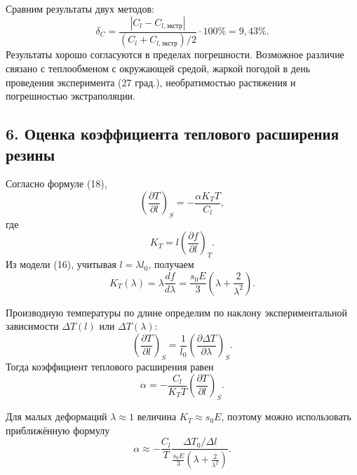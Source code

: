 \documentclass[12pt,a4paper]{article}
\numberwithin{equation}{section}
\begin{document}
Сравним результаты двух методов:
\[
    \delta_C
    =
    \frac{
        \left|C_l-C_{l,\text{экстр}}\right|
    }{
        \left(C_l+C_{l,\text{экстр}}\right)/2
    }\cdot100\%
    =
    9{,}43\%.
\]
Результаты хорошо согласуются в пределах погрешности.
Возможное различие связано с теплообменом с окружающей средой,
жаркой погодой в день проведения эксперимента (27 град.), необратимостью растяжения и погрешностью экстраполяции.

\subsection*{6. Оценка коэффициента теплового расширения резины}

Согласно формуле (18),
\[
    \left(\frac{\partial T}{\partial l}\right)_S
    =
    -\frac{\alpha K_TT}{C_l},
\]
где
\[
    K_T=l\left(\frac{\partial f}{\partial l}\right)_T.
\]
Из модели (16), учитывая $l=\lambda l_0$, получаем
\[
    K_T(\lambda)
    =
    \lambda\frac{df}{d\lambda}
    =
    \frac{s_0E}{3}
    \left(
        \lambda+\frac{2}{\lambda^2}
    \right).
\]

Производную температуры по длине определим по наклону экспериментальной зависимости $\Delta T(l)$ или $\Delta T(\lambda)$:
\[
    \left(\frac{\partial T}{\partial l}\right)_S
    =
    \frac{1}{l_0}
    \left(\frac{\partial\Delta T}{\partial\lambda}\right)_S.
\]
Тогда коэффициент теплового расширения равен
\[
    \alpha
    =
    -\frac{C_l}{K_TT}
    \left(\frac{\partial T}{\partial l}\right)_S.
\]

Для малых деформаций $\lambda\approx1$ величина $K_T\approx s_0E$, поэтому можно использовать приближённую формулу
\[
    \alpha
    \approx
    -\frac{C_l}{T}
    \frac{\Delta T_0/\Delta l}{\frac{s_0E}{3}(\lambda + \frac{2}{\lambda^2})}.
\]
\end{document}
